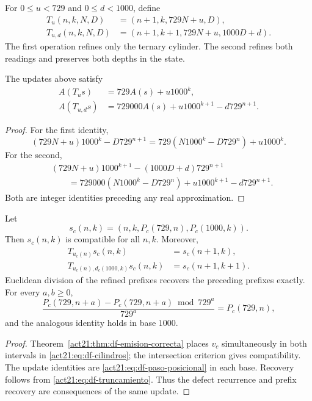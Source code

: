 \begin{definition}
For \(0\leq u<729\) and \(0\leq d<1000\), define
\begin{align*}
 T_u(n,k,N,D)&=(n+1,k,729N+u,D),\\
 T_{u,d}(n,k,N,D)&=(n+1,k+1,729N+u,1000D+d).
\end{align*}
The first operation refines only the ternary cylinder. The second refines
both readings and preserves both depths in the state.
\end{definition}

\begin{proposition}
\label{act21:prop:df-rec-frontera}
The updates above satisfy
\begin{align}
 A(T_u s)&=729A(s)+u1000^k,\label{act21:eq:df-rec-ternaria}\\
 A(T_{u,d}s)&=729000A(s)+u1000^{k+1}-d729^{n+1}.
 \label{act21:eq:df-rec-conjunta}
\end{align}
\end{proposition}

\begin{proof}
For the first identity,
\[
 (729N+u)1000^k-D729^{n+1}
 =729(N1000^k-D729^n)+u1000^k.
\]
For the second,
\begin{align*}
 &(729N+u)1000^{k+1}-(1000D+d)729^{n+1}\\
 &\qquad=729000(N1000^k-D729^n)
      +u1000^{k+1}-d729^{n+1}.
\end{align*}
Both are integer identities preceding any real approximation.
\end{proof}

\begin{theorem}
\label{act21:thm:df-refinamiento-generado}
Let
\[
 s_c(n,k)=(n,k,P_c(729,n),P_c(1000,k)).
\]
Then \(s_c(n,k)\) is compatible for all \(n,k\). Moreover,
\begin{align*}
 T_{u_c(n)}s_c(n,k)&=s_c(n+1,k),\\
 T_{u_c(n),d_c(1000,k)}s_c(n,k)&=s_c(n+1,k+1).
\end{align*}
Euclidean division of the refined prefixes recovers the preceding
prefixes exactly. For every \(a,b\geq0\),
\[
 \frac{P_c(729,n+a)-P_c(729,n+a)\bmod729^a}{729^a}
 =P_c(729,n),
\]
and the analogous identity holds in base \(1000\).
\end{theorem}

\begin{proof}
Theorem~\ref{act21:thm:df-emision-correcta} places \(v_c\) simultaneously in
both intervals in \eqref{act21:eq:df-cilindros}; the intersection criterion
gives compatibility. The update identities are
\eqref{act21:eq:df-paso-posicional} in each base. Recovery follows from
\eqref{act21:eq:df-truncamiento}. Thus the defect recurrence and prefix
recovery are consequences of the same update.
\end{proof}

